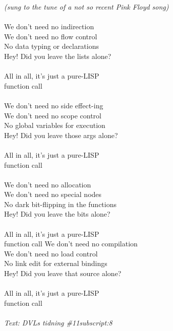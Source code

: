 {\footnotesize\textit{(sung to the tune of a not so recent Pink Floyd song)}}\\
\\
We don’t need no indirection\\
We don’t need no flow control\\
No data typing or declarations\\
Hey! Did you leave the lists alone?\\
\\
All in all, it’s just a pure-LISP\\
function call\\
\\
We don’t need no side effect-ing\\
We don’t need no scope control\\
No global variables for execution\\
Hey! Did you leave those args alone?\\
\\
All in all, it’s just a pure-LISP\\
function call\\
\\
We don’t need no allocation\\
We don’t need no special nodes\\
No dark bit-flipping in the functions\\
Hey! Did you leave the bits alone?\\
\\
All in all, it’s just a pure-LISP\\
function call
\newpage
We don’t need no compilation\\
We don’t need no load control\\
No link edit for external bindings\\
Hey! Did you leave that source alone?\\
\\
All in all, it’s just a pure-LISP\\
function call\\
\\
{\footnotesize\textit{Text: DVLs tidning \#11subscript:8}}
